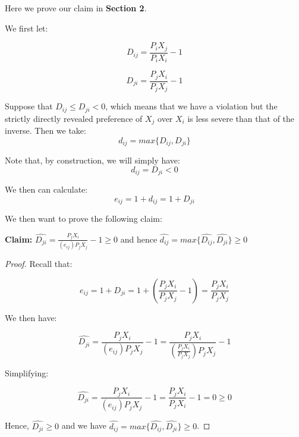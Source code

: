 \documentclass{article} %
\begin{document}
Here we prove our claim in \textbf{Section 2}.
\bigskip

We first let:
\bigskip

\begin{minipage}{.5\linewidth}
$$D_{ij}=\frac{P_iX_j}{P_iX_i}-1$$
\end{minipage}%
\begin{minipage}{.5\linewidth}
$$D_{ji}=\frac{P_jX_i}{P_jX_j}-1$$
\end{minipage}
\bigskip

Suppose that $D_{ij}\leq D_{ji}<0$, which means that we have a violation but the strictly directly revealed preference of $X_j$ over $X_i$ is less severe than that of the inverse. Then we take:
$$d_{ij}=max\{D_{ij},D_{ji}\}$$

Note that, by construction, we will simply have:
$$d_{ij}=D_{ji}<0$$

We then can calculate:
$$e_{ij}=1+d_{ij}=1+D_{ji}$$

We then want to prove the following claim:
\bigskip

\textbf{Claim:} $\hat{D_{ji}}=\frac{P_jX_i}{(e_{ij})P_jX_j}-1\geq0$ and hence $\hat{d_{ij}}=max\{\hat{D_{ij}},\hat{D_{ji}}\}\geq0$
\bigskip

\begin{proof}
Recall that:

$$e_{ij}=1+D_{ji}=1+(\frac{P_jX_i}{P_jX_j}-1)=\frac{P_jX_i}{P_jX_j}$$

We then have:

$$\hat{D_{ji}}=\frac{P_jX_i}{(e_{ij})P_jX_j}-1=\frac{P_jX_i}{(\frac{P_jX_i}{P_jX_j})P_jX_j}-1$$

Simplifying:

$$\hat{D_{ji}}=\frac{P_jX_i}{(e_{ij})P_jX_j}-1=\frac{P_jX_i}{P_jX_i}-1=0\geq0$$

Hence, $\hat{D_{ji}}\geq0$ and we have $\hat{d_{ij}}=max\{\hat{D_{ij}},\hat{D_{ji}}\}\geq0$.

\end{proof}
\end{document}
